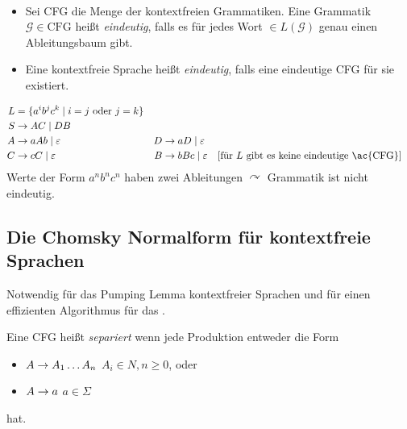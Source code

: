 \begin{Def}[name={[Eindeutigkeit von \acs*{CFG} und \acs*{CFL}]}]\
	\begin{itemize}
	\item Sei CFG die Menge der kontextfreien Grammatiken.
    Eine Grammatik $\mathcal{G}\in \text{CFG}$ heißt \emph{eindeutig}, falls es für jedes Wort $\in L(\mathcal{G})$ genau einen Ableitungsbaum gibt.
	\item Eine kontextfreie Sprache heißt \emph{eindeutig}, falls eine eindeutige \ac{CFG} für sie existiert.
	\end{itemize}
\end{Def}
\begin{Bsp}
	\begin{align*}
		L &= \{ a^ib^jc^k \mid i=j\text{ oder }j=k \}\\
		S &\-> AC \mid DB\\
		A &\-> aAb \mid \Eps & D &\->aD \mid \Eps\\
		C &\->cC \mid \Eps & B &\-> bBc \mid \Eps \quad[\text{für $L$ gibt es keine eindeutige \ac{CFG}}]
	\end{align*}
	Werte der Form $a^nb^nc^n$ haben zwei Ableitungen $\curvearrowright$ Grammatik ist nicht eindeutig.
\end{Bsp}

\subsection{Die Chomsky Normalform für kontextfreie Sprachen}
Notwendig für das Pumping Lemma kontextfreier Sprachen und für einen effizienten Algorithmus für das .


\begin{Def}
  Eine CFG heißt \emph{separiert} wenn jede Produktion entweder die Form
  \begin{itemize}
  \item $A\-> A_1\dots A_n$ \qquad $A_i\in N,n\geq 0$, oder
  \item $A \-> a$ \quad $a\in\Sigma$
  \end{itemize}
  hat.
\end{Def}

